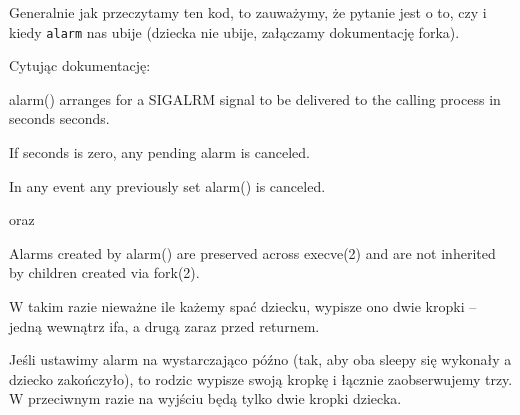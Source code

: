 Generalnie jak przeczytamy ten kod, to zauważymy, że pytanie jest o to, czy i kiedy \texttt{alarm} nas ubije (dziecka nie ubije, załączamy dokumentację forka).

Cytując dokumentację:
\begin{displayquote}
    alarm() arranges for a SIGALRM signal to be delivered to the
       calling process in seconds seconds.

       If seconds is zero, any pending alarm is canceled.

       In any event any previously set alarm() is canceled.
\end{displayquote}
oraz
\begin{displayquote}
    Alarms created by alarm() are preserved across execve(2) and are not inherited by children created via fork(2).
\end{displayquote}

W takim razie nieważne ile każemy spać dziecku, wypisze ono dwie kropki -- jedną wewnątrz ifa, a drugą zaraz przed returnem.

Jeśli ustawimy alarm na wystarczająco późno (tak, aby oba sleepy się wykonały a dziecko zakończyło), to rodzic wypisze swoją kropkę i łącznie zaobserwujemy trzy. W przeciwnym razie na wyjściu będą tylko dwie kropki dziecka.